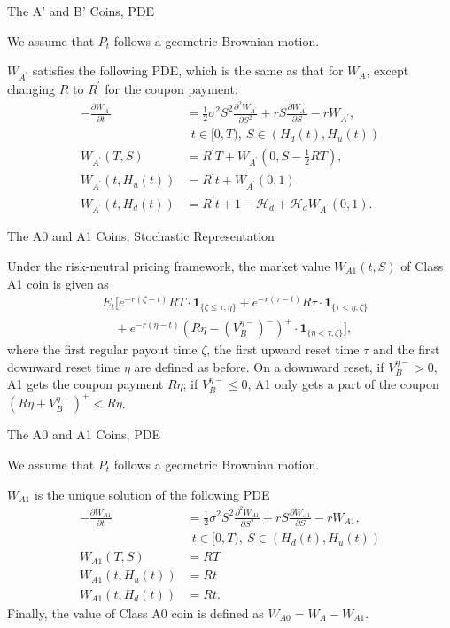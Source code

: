 \documentclass[notes=show, beamer, handout]{beamer}
\begin{document}
\begin{frame}{The A' and B' Coins, PDE}


We assume that $P_t$ follows a geometric Brownian motion.





$W_{A^\prime}$ satisfies the following PDE, which is the same as that for $W_{A}$, except changing $R$ to $R^\prime$ for the coupon payment:
\begin{align*}
-\frac{\partial W_{A^\prime}}{\partial t} & =\frac{1}{2}\sigma^{2}S^{2}\frac{\partial^{2}W_{A^\prime}}{\partial S^{2}}
   +r S\frac{\partial W_{A^\prime}}{\partial S}-r W_{A^\prime}, \\
   &~~t\in[0,T),~S\in (H_d(t),H_u(t))\\
W_{A^\prime}(T,S) & =R^\prime T+W_{A^\prime}(0,S-\frac{1}{2}RT),\\
W_{A^\prime}(t,H_{u}(t)) & =R^\prime t+W_{A^\prime}(0,1)\\
W_{A^\prime}(t,H_d(t)) & =R^\prime t+1-\mathcal{H}_{d}+\mathcal{H}_{d}W_{A^\prime}(0,1).
\end{align*}
\end{frame}

\begin{frame}{The  A0 and A1 Coins, Stochastic Representation}

Under the risk-neutral pricing framework, the market value $W_{A1}(t,S)$ of Class A1 coin is given as
\begin{align*}
 & E_{t}\Bigg[e^{-r(\zeta-t)}RT\cdot\mathbf{1}_{\{\zeta\le\tau,\eta\}}+e^{-r(\tau-t)}R\tau\cdot\mathbf{1}_{\{\tau<\eta,\zeta\}}\\
 &\quad+e^{-r(\eta-t)}(R\eta-(V_B^{\eta-})^-)^+\cdot\mathbf{1}_{\{\eta<\tau,\zeta\}}\Bigg],
\end{align*}
where the first regular payout time $\zeta$, the first upward reset time $\tau$ and the first downward reset time $\eta$ are defined as before. On a downward reset, if $V_B^{\eta-}>0$, A1 gets the coupon payment $R\eta$; if $V_B^{\eta-}\le 0$, A1 only gets a part of the coupon $(R\eta+V_B^{\eta-})^+ < R\eta$. 


\end{frame}


\begin{frame}{The A0 and A1 Coins, PDE}

We assume that $P_t$ follows a geometric Brownian motion.

$W_{A1}$ is the unique solution of the following PDE
\begin{align*}
-\frac{\partial W_{A1}}{\partial t} & =\frac{1}{2}\sigma^{2}S^{2}\frac{\partial^{2}W_{A1}}{\partial S^{2}}+r S\frac{\partial W_{A1}}{\partial S}-r W_{A1},\\
& ~~t\in[0,T),~S\in (H_d(t),H_u(t))\\
W_{A1}(T,S) & =RT\\
W_{A1}(t,H_{u}(t)) & =Rt\\
W_{A1}(t,H_d(t)) & =Rt.
\end{align*}
Finally, the value of Class A0 coin is defined as $W_{A0}=W_A-W_{A1}$.

\end{frame}
\end{document}
